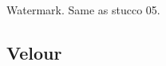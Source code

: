 \documentclass[12pt,a4paper]{article}
\begin{document}
\begin{singlespace}
\renewcommand{\Number}{01}\InputImage{\sfl}{\tsm}{\sro}{\tco}{\sro}{\tco}
{}{}
\renewcommand{\Number}{02}\InputImage{\sro}{\tco}{\sro}{\tco}{\sro}{\tco}
{Watermark.}{}
\renewcommand{\Number}{03}\InputImage{\sfl}{\tco}{\sfl}{\tco}{\sfl}{\tco}
{}{}
\renewcommand{\Number}{04}\InputImage{\sfl}{\tco}{\sfl}{\tco}{\sfl}{\tco}
{}{}
\renewcommand{\Number}{05}\InputImage{\sfl}{\tco}{\sro}{\tco}{\sro}{\tco}
{}{}
\renewcommand{\Number}{06}\InputImage{\sfl}{\tco}{\sro}{\tco}{\sro}{\tco}
{}{}
\renewcommand{\Number}{07}\InputImage{\sfl}{\tco}{\sfl}{\tco}{\sexdi}{\tbu}
{}{}
\renewcommand{\Number}{08}\InputImage{\sfl}{\tco}{\sfl}{\tco}{\sfl}{\tco}
{}{}
\renewcommand{\Number}{09}\InputImage{\sfl}{\tco}{\sfl}{\tco}{\sfl}{\tco}
{}{}
\renewcommand{\Number}{10}\InputImage{\sfl}{\tco}{\sro}{\tco}{\sro}{\tco}
{}{Same as stucco 05.}
\renewcommand{\Number}{11}\InputImage{\sfl}{\tco}{\sro}{\tco}{\sro}{\tco}
{}{}
\renewcommand{\Number}{12}\InputImage{\sfl}{\tco}{\sfl}{\tco}{\sfl}{\tco}
{}{}

\clearpage
\renewcommand{\mat}{Velour}
\subsection{\mat}

\renewcommand{\Number}{01}\InputImage{\sfl}{\tve}{\sfl}{\tve}{\sfl}{\tve}
{}{}
\renewcommand{\Number}{02}\InputImage{\sfl}{\tve}{\sfl}{\tve}{\sexdi}{\tbu}
{}{}
\renewcommand{\Number}{03}\InputImage{\sfl}{\tve}{\sfl}{\tve}{\sexdi}{\tbu}
{}{}
\renewcommand{\Number}{04}\InputImage{\sfl}{\tve}{\sfl}{\tve}{\sexdi}{\tbu}
{}{}
\renewcommand{\Number}{05}\InputImage{\sexdi}{\tco}{\sexdi}{\tco}{\sfl}{\tve}
{}{}
\renewcommand{\Number}{06}\InputImage{\sfl}{\tve}{\sfl}{\tve}{\sexor}{\tbu}
{}{}
\renewcommand{\Number}{07}\InputImage{\sfl}{\tve}{\sfl}{\tve}{\sexdi}{\tbu}
{}{}
\renewcommand{\Number}{08}\InputImage{\sfl}{\tve}{\sfl}{\tve}{\sexdi}{\tbu}
{}{}
\renewcommand{\Number}{09}\InputImage{\sfl}{\tve}{\sfl}{\tve}{\sexdi}{\tbu}
{}{}
\renewcommand{\Number}{10}\InputImage{\sfl}{\tve}{\sfl}{\tve}{\sexdi}{\tbu}
{}{}
\renewcommand{\Number}{11}\InputImage{\sfl}{\tve}{\sfl}{\tve}{\sexor}{\tbu}
{}{}
\renewcommand{\Number}{12}\InputImage{\sfl}{\tve}{\sfl}{\tve}{\sfl}{\tve}
{}{}

\clearpage
{}


\end{singlespace}
\end{document}
